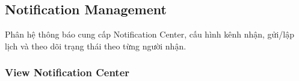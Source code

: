 \documentclass[12pt,a4paper,oneside]{report}
\begin{document}

\subsection{Notification Management}
\label{subsec:notification-management}

Phân hệ thông báo cung cấp Notification Center, cấu hình kênh nhận, gửi/lập lịch và theo dõi trạng thái theo từng người nhận.

\subsubsection{View Notification Center}
\label{subsubsec:view-notification-center}
\end{document}
